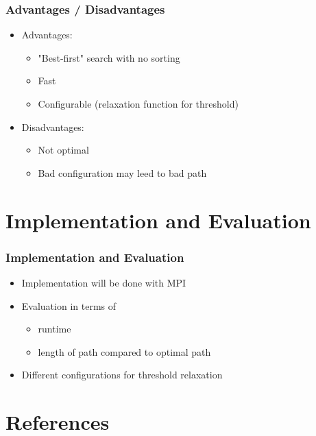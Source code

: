 \documentclass{beamer}
\begin{document}
\begin{frame}
\frametitle{Advantages / Disadvantages}
\begin{itemize}
\item Advantages:
	\begin{itemize}
	\item "Best-first" search with no sorting
	\item Fast
	\item Configurable (relaxation function for threshold)
	\end{itemize}
\item Disadvantages:
	\begin{itemize}
	\item Not optimal
	\item Bad configuration may leed to bad path
	\end{itemize}
\end{itemize}
\end{frame}



\section{Implementation and Evaluation}

\begin{frame}
\frametitle{Implementation and Evaluation}
\begin{itemize}
\item Implementation will be done with MPI
\item Evaluation in terms of
	\begin{itemize}
	\item runtime
	\item length of path compared to optimal path
	\end{itemize}
\item Different configurations for threshold relaxation
\end{itemize}
\end{frame}


\section{References}
\end{document}
